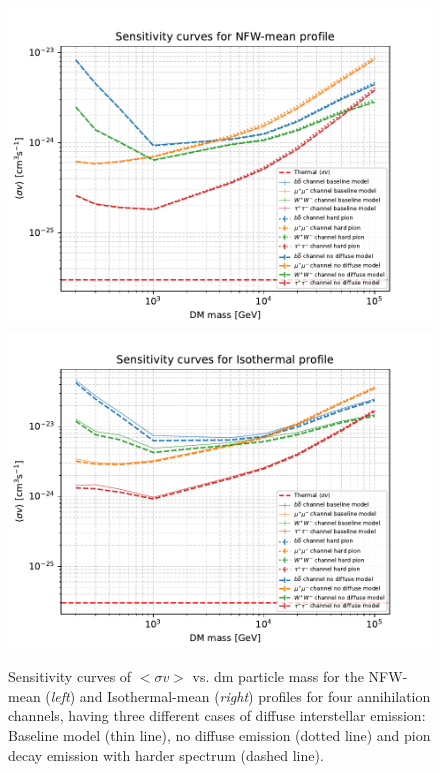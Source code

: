 \documentclass[main.tex]{subfiles}
\begin{document}
\begin{figure}[h!]
  \centering
  \includegraphics[width=1\textwidth]{Pictures/Limits_NFW-mean_comparediff.pdf}
  \endminipage
  \includegraphics[width=1\textwidth]{Pictures/Limits_Isothermal_comparediff.pdf}
  \endminipage
  \caption{Sensitivity curves of $<\sigma v >$ vs. \gls{dm} particle mass for the NFW-mean (\textit{left}) and Isothermal-mean (\textit{right}) profiles for four annihilation channels, having three different cases of diffuse interstellar emission: Baseline model (thin line), no diffuse emission (dotted line) and pion decay emission with harder spectrum (dashed line).}
  \label{fig:dmsensi_diff}
  \end{figure}
\end{document}
